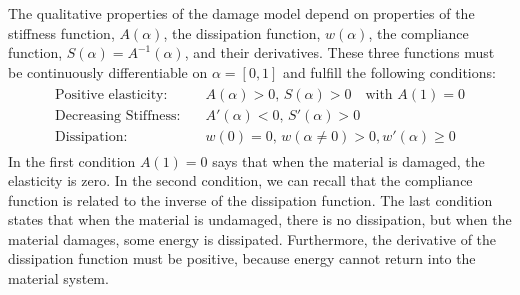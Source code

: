 \documentclass[12pt,3p]{article}
\numberwithin{equation}{section}
\begin{document}
The qualitative properties of the damage model depend on properties of the stiffness function, $A(\alpha)$, the dissipation function, $w(\alpha)$, the compliance function, $S(\alpha) = A^{-1} (\alpha)$, and their derivatives. These three functions must be continuously differentiable on $\alpha = [0, 1]$ and fulfill the following conditions: 
\begin{align}\label{Hypothesis1}
\begin{split}
\text{Positive elasticity}:& \quad A(\alpha) > 0, \, S(\alpha) > 0 \quad \text{with } A(1) = 0 \\
\text{Decreasing Stiffness}:& \quad A'(\alpha) < 0, \, S'(\alpha) > 0 \\
\text{Dissipation}:& \quad w(0) = 0, \, w(\alpha \neq 0) > 0, w'(\alpha) \geq 0
\end{split}
\end{align}
In the first condition $A(1) = 0$ says that when the material is damaged, the elasticity is zero. In the second condition, we can recall that the compliance function is related to the inverse of the dissipation function. The last condition states that when the material is undamaged, there is no dissipation, but when the material damages, some energy is dissipated. Furthermore, the derivative of the dissipation function must be positive, because energy cannot return into the material system. 

\end{document}
